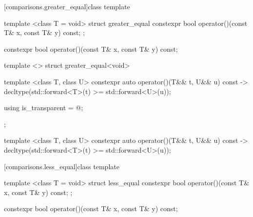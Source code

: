 \begin{itemdescr}
\pnum\returns {}
\end{itemdescr}

[comparisons.greater_equal]{class template }

%
\begin{itemdecl}
template <class T = void> struct greater_equal {
  constexpr bool operator()(const T& x, const T& y) const;
};
\end{itemdecl}

%
\begin{itemdecl}
constexpr bool operator()(const T& x, const T& y) const;
\end{itemdecl}

\begin{itemdescr}
\pnum\returns {}
\end{itemdescr}

%
\begin{itemdecl}
template <> struct greater_equal<void> {
  template <class T, class U> constexpr auto operator()(T&& t, U&& u) const
    -> decltype(std::forward<T>(t) >= std::forward<U>(u));

  using is_transparent = @\unspec@;
};
\end{itemdecl}

%
\begin{itemdecl}
template <class T, class U> constexpr auto operator()(T&& t, U&& u) const
    -> decltype(std::forward<T>(t) >= std::forward<U>(u));
\end{itemdecl}

\begin{itemdescr}
\pnum\returns {}
\end{itemdescr}

[comparisons.less_equal]{class template }

%
\begin{itemdecl}
template <class T = void> struct less_equal {
  constexpr bool operator()(const T& x, const T& y) const;
};
\end{itemdecl}

%
\begin{itemdecl}
constexpr bool operator()(const T& x, const T& y) const;
\end{itemdecl}


